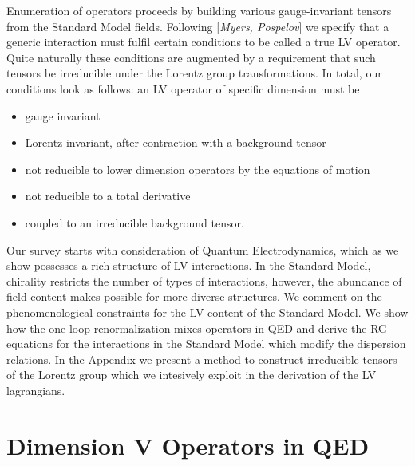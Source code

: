 \documentclass[12pt]{revtex4}
\begin{document}
	Enumeration of operators proceeds by building various gauge-invariant tensors
	from the Standard Model fields. 
	Following [{\it Myers, Pospelov}] we specify that a generic interaction must
	fulfil certain conditions to be called a true LV operator. 
	Quite naturally these conditions are augmented by a requirement that such
	tensors be irreducible under the Lorentz group transformations.
	In total, our conditions look as follows: 
	an LV operator of specific dimension must be
\begin{itemize}
	\item gauge invariant
	\item Lorentz invariant, after contraction with a background tensor
	\item not reducible to lower dimension operators by the equations
		of motion
	\item not reducible to a total derivative
	\item coupled to an irreducible background tensor.
\end{itemize}

	Our survey starts with consideration of Quantum Electrodynamics, 
	which as we show possesses a rich structure of LV interactions.
	In the Standard Model, chirality restricts the number of types
	of interactions, however, the abundance of field content makes
	possible for more diverse structures.
	We comment on the phenomenological constraints for the LV 
	content of the Standard Model.
	We show how the one-loop renormalization mixes operators in QED
	and derive the RG equations for the interactions in the Standard
	Model which modify the dispersion relations.
	In the Appendix we present a method to construct 
	irreducible tensors of the Lorentz group which we intesively
	exploit in the derivation of the LV lagrangians.
	

\section{Dimension V Operators in QED}
\end{document}
